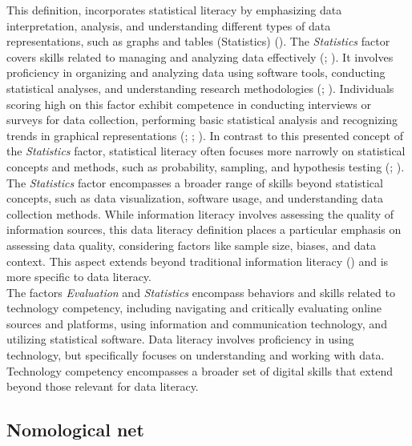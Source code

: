 \documentclass[
  12pt,
  a4paper,
  twoside]{article}
\begin{document}
This definition, incorporates statistical literacy by emphasizing data interpretation, analysis, and understanding different types of data representations, such as graphs and tables (Statistics) ().
The \emph{Statistics} factor covers skills related to managing and analyzing data effectively (; ). It involves proficiency in organizing and analyzing data using software tools, conducting statistical analyses, and understanding research methodologies (; ). Individuals scoring high on this factor exhibit competence in conducting interviews or surveys for data collection, performing basic statistical analysis and recognizing trends in graphical representations (; ; ). In contrast to this presented concept of the \emph{Statistics} factor, statistical literacy often focuses more narrowly on statistical concepts and methods, such as probability, sampling, and hypothesis testing (; ). The \emph{Statistics} factor encompasses a broader range of skills beyond statistical concepts, such as data visualization, software usage, and understanding data collection methods. While information literacy involves assessing the quality of information sources, this data literacy definition places a particular emphasis on assessing data quality, considering factors like sample size, biases, and data context. This aspect extends beyond traditional information literacy () and is more specific to data literacy.\\
The factors \emph{Evaluation} and \emph{Statistics} encompass behaviors and skills related to technology competency, including navigating and critically evaluating online sources and platforms, using information and communication technology, and utilizing statistical software. Data literacy involves proficiency in using technology, but specifically focuses on understanding and working with data. Technology competency encompasses a broader set of digital skills that extend beyond those relevant for data literacy.

\subsection{Nomological net}\label{nomological-net}
\end{document}
